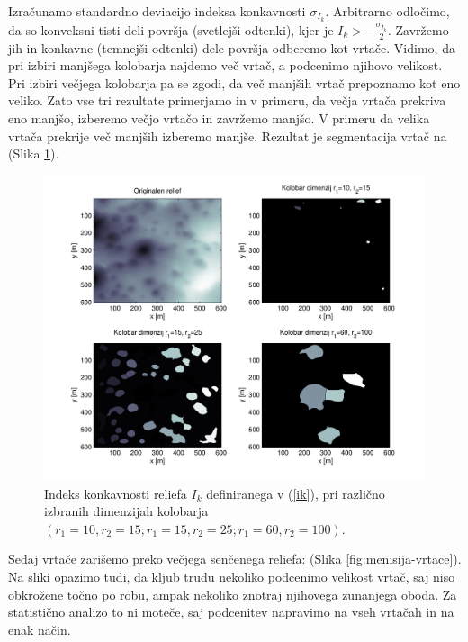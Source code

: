 \documentclass[a4paper, twoside, 12pt]{book}
\begin{document}
Izračunamo standardno deviacijo indeksa konkavnosti $\sigma_{I_k}$. Arbitrarno odločimo, da so konveksni tisti deli površja (svetlejši odtenki), kjer je $I_k > -\frac{\sigma_{I_k}}{2}$. Zavržemo jih in konkavne (temnejši odtenki) dele površja odberemo kot vrtače. Vidimo, da pri izbiri manjšega kolobarja najdemo več vrtač, a podcenimo njihovo velikost. Pri izbiri večjega kolobarja pa se zgodi, da več manjših vrtač prepoznamo kot eno veliko. Zato vse tri rezultate primerjamo in v primeru, da večja vrtača prekriva eno manjšo, izberemo večjo vrtačo in zavržemo manjšo. V primeru da velika vrtača prekrije več manjših izberemo manjše. Rezultat je segmentacija vrtač na (Slika \ref{fig:concavity-segmentation-samples}).
  \begin{figure}[h!]
    \begin{center}
      \includegraphics[width=12cm]{slike/concavity-segmentation-samples.pdf}
    \end{center}
    \caption{Indeks konkavnosti reliefa $I_k$ definiranega v (\ref{ik}), pri različno izbranih dimenzijah kolobarja $(r_1=10,r_2=15;r_1=15,r_2=25;r_1=60,r_2=100)$.}
    \label{fig:concavity-segmentation-samples}
  \end{figure}
Sedaj vrtače zarišemo preko večjega senčenega reliefa: (Slika \ref{fig:menisija-vrtace}). Na sliki opazimo tudi, da kljub trudu nekoliko podcenimo velikost vrtač, saj niso obkrožene točno po robu, ampak nekoliko znotraj njihovega zunanjega oboda. Za statistično analizo to ni moteče, saj podcenitev napravimo na vseh vrtačah in na enak način.
\end{document}

